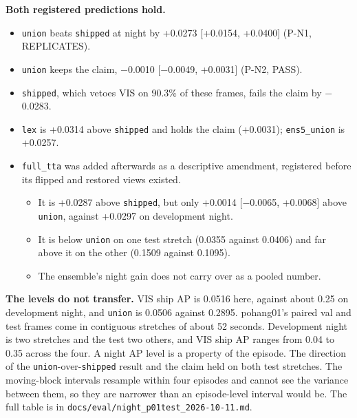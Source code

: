 \documentclass[10pt]{article}
\begin{document}
\textbf{Both registered predictions hold.}
\begin{itemize}
\item \texttt{union} beats \texttt{shipped} at night by +0.0273 [+0.0154, +0.0400] (P-N1, REPLICATES).
\item \texttt{union} keeps the claim, $-$0.0010 [$-$0.0049, +0.0031] (P-N2, PASS).
\item \texttt{shipped}, which vetoes VIS on 90.3\% of these frames, fails the claim by $-$0.0283.
\item \texttt{lex} is +0.0314 above \texttt{shipped} and holds the claim (+0.0031); \texttt{ens5\_\allowbreak{}union} is +0.0257.
\item \texttt{full\_\allowbreak{}tta} was added afterwards as a descriptive amendment, registered before its flipped and restored views existed.
\begin{itemize}
\item It is +0.0287 above \texttt{shipped}, but only +0.0014 [$-$0.0065, +0.0068] above \texttt{union}, against +0.0297 on development night.
\item It is below \texttt{union} on one test stretch (0.0355 against 0.0406) and far above it on the other (0.1509 against 0.1095).
\item The ensemble's night gain does not carry over as a pooled number.
\end{itemize}
\end{itemize}

\textbf{The levels do not transfer.} VIS ship AP is 0.0516 here, against about 0.25 on development night, and \texttt{union} is 0.0506 against 0.2895. pohang01's paired val and test frames come in contiguous stretches of about 52 seconds. Development night is two stretches and the test two others, and VIS ship AP ranges from 0.04 to 0.35 across the four. A night AP level is a property of the episode. The direction of the \texttt{union}-over-\texttt{shipped} result and the claim held on both test stretches. The moving-block intervals resample within four episodes and cannot see the variance between them, so they are narrower than an episode-level interval would be. The full table is in \texttt{docs/\allowbreak{}eval/\allowbreak{}night\_\allowbreak{}p01test\_\allowbreak{}2026-10-11.md}.

\FloatBarrier
\end{document}
